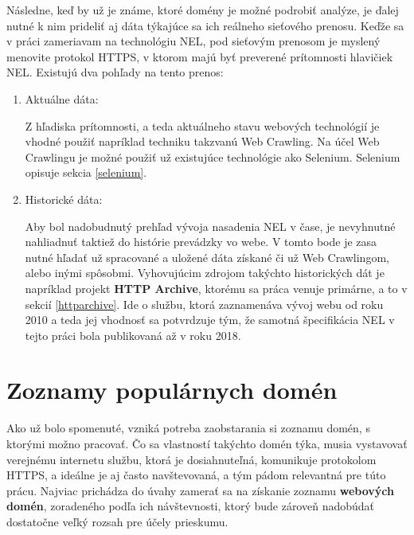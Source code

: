 Následne, keď by už je známe, ktoré domény je možné podrobiť analýze, je ďalej nutné k nim prideliť aj dáta týkajúce sa ich reálneho sieťového prenosu.
Keďže sa v práci zameriavam na technológiu NEL, pod sieťovým prenosom je myslený menovite protokol HTTPS, v ktorom majú byť preverené prítomnosti hlavičiek NEL. 
Existujú dva pohľady na tento prenos:
\begin{enumerate}
    \item Aktuálne dáta:
    
    Z hľadiska prítomnosti, a teda aktuálneho stavu webových technológií je vhodné použiť napríklad techniku takzvanú Web Crawling.
    Na účel Web Crawlingu je možné použiť už existujúce technológie ako Selenium. 
    Selenium opisuje sekcia \ref{selenium}.

    \pagebreak
    
    \item Historické dáta:

    Aby bol nadobudnutý prehľad vývoja nasadenia NEL v čase, je nevyhnutné nahliadnuť taktiež do histórie prevádzky vo webe. 
    V tomto bode je zasa nutné hľadať už spracované a uložené dáta získané či už Web Crawlingom, alebo inými spôsobmi. 
    Vyhovujúcim zdrojom takýchto historických dát je napríklad projekt \textbf{HTTP Archive}, ktorému sa práca venuje primárne, a to v sekcií \ref{httparchive}.
    Ide o službu, ktorá zaznamenáva vývoj webu od roku 2010 a teda jej vhodnosť sa potvrdzuje tým, že samotná špecifikácia NEL v tejto práci bola publikovaná až v roku 2018.
\end{enumerate}



\section{Zoznamy populárnych domén}
\label{tranco}

Ako už bolo spomenuté, vzniká potreba zaobstarania si zoznamu domén, s ktorými možno pracovať. Čo sa vlastností takýchto domén týka,
musia vystavovať verejnému internetu službu, ktorá je dosiahnuteľná, komunikuje protokolom HTTPS, a ideálne je aj často navštevovaná,
a tým pádom relevantná pre túto prácu. 
Najviac prichádza do úvahy zamerať sa na získanie zoznamu \textbf{webových domén}, zoradeného podľa
ich návštevnosti, ktorý bude zároveň nadobúdať dostatočne veľký rozsah pre účely prieskumu. 

